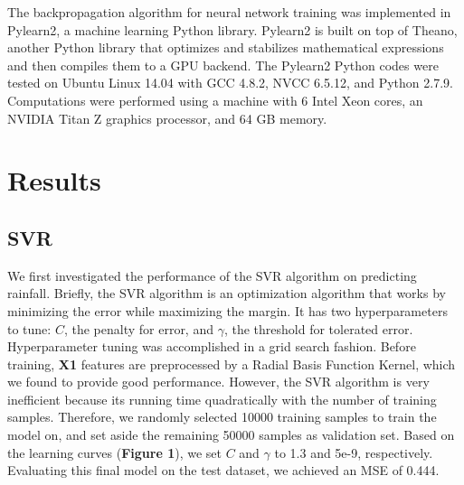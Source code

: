 \documentclass[12pt] {article}
\begin{document}
The backpropagation algorithm for neural network training was implemented in Pylearn2, a machine learning Python library. Pylearn2 is built on top of Theano, another Python library that optimizes and stabilizes mathematical expressions and then compiles them to a GPU backend. The Pylearn2 Python codes were tested on Ubuntu Linux 14.04 with GCC 4.8.2, NVCC 6.5.12, and Python 2.7.9. Computations were performed using a machine with 6 Intel Xeon cores, an NVIDIA Titan Z graphics processor, and 64 GB memory.

\section{Results}
\subsection{SVR}
We first investigated the performance of the SVR algorithm on predicting rainfall. Briefly, the SVR algorithm is an optimization algorithm that works by minimizing the error while maximizing the margin. It has two hyperparameters to tune: $C$, the penalty for error, and $\gamma$, the threshold for tolerated error. Hyperparameter tuning was accomplished in a grid search fashion. Before training, \textbf{X1} features are preprocessed by a Radial Basis Function Kernel, which we found to provide good performance. However, the SVR algorithm is very inefficient because its running time quadratically with the number of training samples. Therefore, we randomly selected 10000 training samples to train the model on, and set aside the remaining 50000 samples as validation set. Based on the learning curves (\textbf{Figure 1}), we set $C$ and $\gamma$ to 1.3 and 5e-9, respectively. Evaluating this final model on the test dataset, we achieved an MSE of 0.444.
\end{document}
